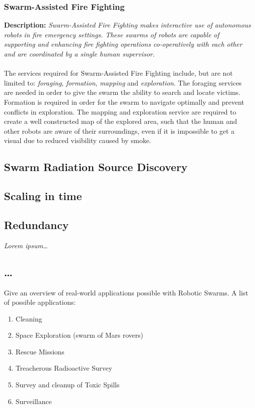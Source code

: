 \documentclass[a4paper]{article}
\begin{document}
  \subsubsection{Swarm-Assisted Fire Fighting}
  \textbf{Description: }\emph{Swarm-Assisted Fire Fighting makes interactive use of autonomous robots in fire emergency settings. These swarms of robots are capable of supporting and enhancing fire fighting operations co-operatively with each other and are coordinated by a single human supervisor.}\cite{Naghsh2008,Penders2011}\\\\
  The services required for Swarm-Assisted Fire Fighting include, but are not limited to: \emph{foraging}, \emph{formation}, \emph{mapping} and \emph{exploration}.\cite{Naghsh2008,Penders2011} The foraging services are needed in order to give the swarm the ability to search and locate victims. Formation is required in order for the swarm to navigate optimally and prevent conflicts in exploration. The mapping and exploration service are required to create a well constructed map of the explored area, such that the human and other robots are aware of their surroundings, even if it is impossible to get a visual due to reduced visibility caused by smoke.

  \subsection{Swarm Radiation Source Discovery}
  \subsection{Scaling in time}
  \subsection{Redundancy}
  
  \emph{Lorem ipsum\ldots}

  \subsection{\ldots}
  Give an overview of real-world applications possible with Robotic Swarms. A list of possible applications:
  \begin{enumerate}
    \item Cleaning
    \item Space Exploration (swarm of Mars rovers)
    \item Rescue Missions
    \item Treacherous Radioactive Survey
    \item Survey and cleanup of Toxic Spills
    \item Surveillance
  \end{enumerate}
\end{document}
